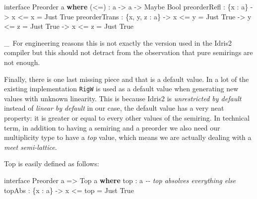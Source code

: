 \documentclass[
]{article}
\newenvironment{Shaded}{}{}
\newcommand{\CommentTok}[1]{\textcolor[rgb]{0.38,0.63,0.69}{\textit{#1}}}
\newcommand{\DataTypeTok}[1]{\textcolor[rgb]{0.56,0.13,0.00}{#1}}
\newcommand{\KeywordTok}[1]{\textcolor[rgb]{0.00,0.44,0.13}{\textbf{#1}}}
\newcommand{\NormalTok}[1]{#1}
\newcommand{\OperatorTok}[1]{\textcolor[rgb]{0.40,0.40,0.40}{#1}}
\newcommand{\OtherTok}[1]{\textcolor[rgb]{0.00,0.44,0.13}{#1}}
\begin{document}
\begin{Shaded}
\begin{Highlighting}[]
\NormalTok{interface }\DataTypeTok{Preorder}\NormalTok{ a }\KeywordTok{where}
\NormalTok{  (}\OperatorTok{\textless{}=}\NormalTok{) }\OperatorTok{:}\NormalTok{ a }\OtherTok{{-}\textgreater{}}\NormalTok{ a }\OtherTok{{-}\textgreater{}} \DataTypeTok{Maybe} \DataTypeTok{Bool}
\NormalTok{  preorderRefl }\OperatorTok{:}\NormalTok{ \{x }\OperatorTok{:}\NormalTok{ a\} }\OtherTok{{-}\textgreater{}}\NormalTok{ x }\OperatorTok{\textless{}=}\NormalTok{ x }\OtherTok{=} \DataTypeTok{Just} \DataTypeTok{True}
\NormalTok{  preorderTrans }\OperatorTok{:}\NormalTok{ \{x, y, z }\OperatorTok{:}\NormalTok{ a\} }\OtherTok{{-}\textgreater{}}\NormalTok{ x }\OperatorTok{\textless{}=}\NormalTok{ y }\OtherTok{=} \DataTypeTok{Just} \DataTypeTok{True} \OtherTok{{-}\textgreater{}}\NormalTok{ y }\OperatorTok{\textless{}=}\NormalTok{ z }\OtherTok{=} \DataTypeTok{Just} \DataTypeTok{True} \OtherTok{{-}\textgreater{}}\NormalTok{ x }\OperatorTok{\textless{}=}\NormalTok{ z }\OtherTok{=} \DataTypeTok{Just} \DataTypeTok{True}
\end{Highlighting}
\end{Shaded}

\_~For engineering reasons this is not exactly the version used in the
Idris2 compiler but this should not detract from the observation that
pure semirings are not enough.

Finally, there is one last missing piece and that is a default value. In
a lot of the existing implementation \texttt{RigW} is used as a default
value when generating new values with unknown linearity. This is because
Idris2 is \emph{unrestricted by default} instead of \emph{linear by
default} in our case, the default value has a very neat property: it is
greater or equal to every other values of the semiring. In technical
term, in addition to having a semiring and a preorder we also need our
multiplicity type to have a \emph{top} value, which means we are
actually dealing with a \emph{meet semi-lattice}.

Top is easily defined as follows:

\begin{Shaded}
\begin{Highlighting}[]
\NormalTok{interface }\DataTypeTok{Preorder}\NormalTok{ a }\OtherTok{=\textgreater{}} \DataTypeTok{Top}\NormalTok{ a }\KeywordTok{where}
\NormalTok{  top }\OperatorTok{:}\NormalTok{ a}
  \CommentTok{{-}{-} top absolves everything else}
\NormalTok{  topAbs }\OperatorTok{:}\NormalTok{ \{x }\OperatorTok{:}\NormalTok{ a\} }\OtherTok{{-}\textgreater{}}\NormalTok{ x }\OperatorTok{\textless{}=}\NormalTok{ top }\OtherTok{=} \DataTypeTok{Just} \DataTypeTok{True}
\end{Highlighting}
\end{Shaded}
\end{document}
